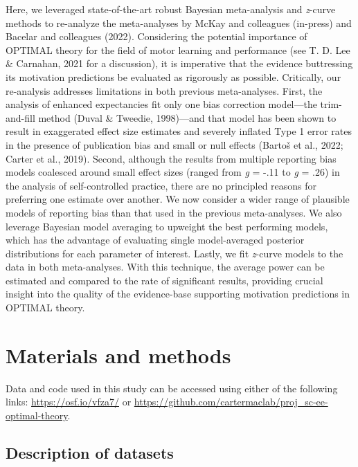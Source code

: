 \documentclass[
  doc, donotrepeattitle,floatsintext]{apa7}
\begin{document}
Here, we leveraged state-of-the-art robust Bayesian meta-analysis and \emph{z}-curve methods to re-analyze the meta-analyses by McKay and colleagues (in-press) and Bacelar and colleagues (2022). Considering the potential importance of OPTIMAL theory for the field of motor learning and performance (see T. D. Lee \& Carnahan, 2021 for a discussion), it is imperative that the evidence buttressing its motivation predictions be evaluated as rigorously as possible. Critically, our re-analysis addresses limitations in both previous meta-analyses. First, the analysis of enhanced expectancies fit only one bias correction model---the trim-and-fill method (Duval \& Tweedie, 1998)---and that model has been shown to result in exaggerated effect size estimates and severely inflated Type 1 error rates in the presence of publication bias and small or null effects (Bartoš et al., 2022; Carter et al., 2019). Second, although the results from multiple reporting bias models coalesced around small effect sizes (ranged from \emph{g} = -.11 to \emph{g} = .26) in the analysis of self-controlled practice, there are no principled reasons for preferring one estimate over another. We now consider a wider range of plausible models of reporting bias than that used in the previous meta-analyses. We also leverage Bayesian model averaging to upweight the best performing models, which has the advantage of evaluating single model-averaged posterior distributions for each parameter of interest. Lastly, we fit \emph{z}-curve models to the data in both meta-analyses. With this technique, the average power can be estimated and compared to the rate of significant results, providing crucial insight into the quality of the evidence-base supporting motivation predictions in OPTIMAL theory.

\hypertarget{materials-and-methods}{%
\section{Materials and methods}\label{materials-and-methods}}

Data and code used in this study can be accessed using either of the following links: \url{https://osf.io/vfza7/} or \url{https://github.com/cartermaclab/proj_sc-ee-optimal-theory}.

\hypertarget{description-of-datasets}{%
\subsection{Description of datasets}\label{description-of-datasets}}
\end{document}
